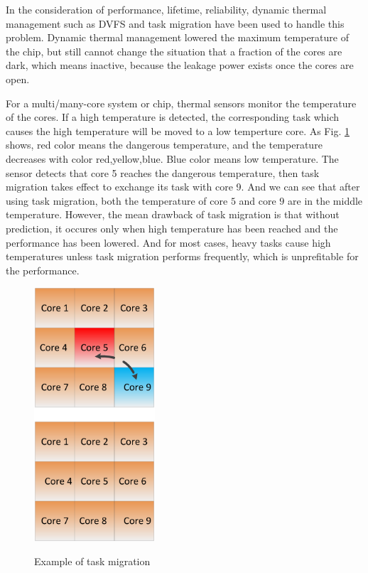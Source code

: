  In the consideration of performance, lifetime, reliability, dynamic thermal management such as DVFS and task migration have been used to handle this problem. Dynamic thermal management lowered the maximum temperature of the chip, but still cannot change the situation  that a fraction of the cores are dark, which means inactive, because the leakage power exists once the cores are open.

For a multi/many-core system or chip, thermal sensors monitor \cite{WangTan:ICCAD'11} the temperature of the cores. If a high temperature is detected, the corresponding task which causes the high temperature will be moved to a low temperture core. As Fig. \ref{task} shows, red color means the dangerous temperature, and the temperature decreases with color red,yellow,blue. Blue color means low temperature. The sensor detects that core 5 reaches the dangerous temperature, then task migration takes effect to exchange its task with core 9.  And we can see that after using task migration, both the temperature of core $5$ and core $9$ are in the middle temperature.
 However, the mean drawback of task migration is that without prediction, it occures only when high temperature has been reached and the performance has been lowered. And for most cases, heavy tasks cause high temperatures unless task migration performs frequently, which is unprefitable for the performance.
\begin{figure}
  \centering
     {
       \includegraphics[width=0.4\textwidth]{fig/task}
     }
     \caption{Example of task migration}\label{task}
\end{figure}
